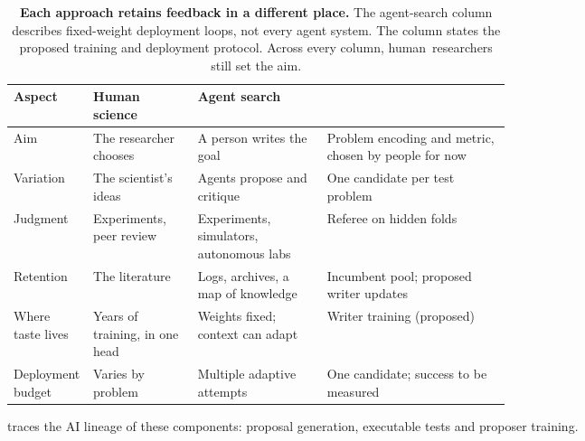 \begin{table}[t]
  \caption{\textbf{Each approach retains feedback in a different place.} The agent-search column describes
fixed-weight deployment loops, not every agent system. The \EZ{} column
states the proposed training and deployment protocol. Across every column,
\mbox{human researchers} still set the aim.}
  \label{tab:where}
  \centering
  \footnotesize
  \setlength{\tabcolsep}{3.5pt}
  \setlength{\extrarowheight}{2pt}%
  \begin{tabularx}{\linewidth}{@{}>{\raggedright\arraybackslash}p{0.16\linewidth}>{\raggedright\arraybackslash}p{0.21\linewidth}>{\raggedright\arraybackslash}p{0.265\linewidth}>{\raggedright\arraybackslash}X@{}}
    \toprule
    Aspect & Human science & Agent search & \EZ{} \\
    \midrule
    Aim & The researcher chooses & A person writes the goal & Problem encoding and metric, chosen by people for now \\
    Variation & The scientist's ideas & Agents propose and critique & One candidate per test problem \\
    Judgment & Experiments, peer review & Experiments, simulators, autonomous labs & Referee on hidden folds \\
    Retention & The literature & Logs, archives, a map of knowledge & Incumbent pool; proposed writer updates \\
    \midrule
    Where taste lives & Years of training, in one head & Weights fixed; context can adapt & Writer training (proposed) \\
    Deployment budget & Varies by problem & Multiple adaptive attempts & One candidate; success to be measured \\
    \bottomrule
  \end{tabularx}
\end{table}

 traces the AI lineage of these components: proposal
generation, executable tests and proposer training.
